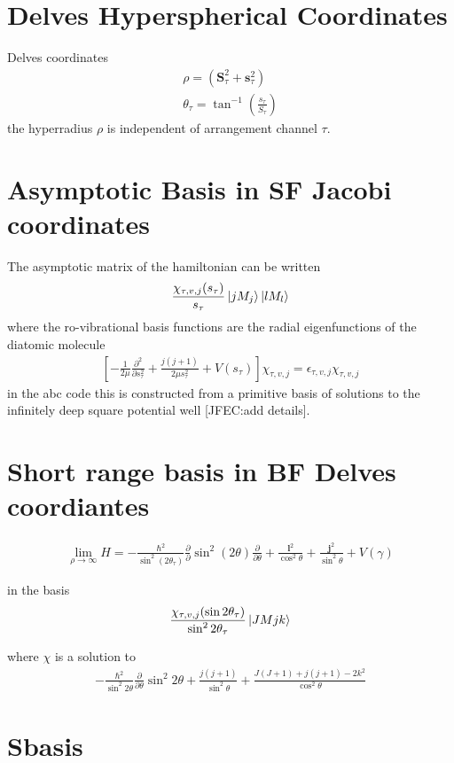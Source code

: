 \documentclass[aps,pra,onecolumn,showpacs,floatfix]{revtex4}
\begin{document}
\section{Delves Hyperspherical Coordinates}
Delves coordinates\cite{Delves:1958,Delves:1960}
\begin{align}\label{eqn:delves}
	\rho = (\mathbf{S}^2_\tau + \mathbf{s}^2_\tau ) \\
	\theta_\tau = \tan^{-1}({\frac{s_\tau}{S_\tau}})
\end{align}
the hyperradius $\rho$ is independent of arrangement channel $\tau$.

\section{Asymptotic Basis in SF Jacobi coordinates}
The asymptotic matrix of the hamiltonian can be written
\begin{align}\label{eqn:delves}
	\frac{\chi_{\tau,v,j}(s_\tau)}{s_\tau}\ket{jM_j}\ket{lM_l}
\end{align}
where the ro-vibrational basis functions are the radial eigenfunctions of the
diatomic molecule
\begin{align}\label{eqn:delves}
\left[-\frac{1}{2\mu}\frac{\partial^2}{\partial s_\tau^2} + \frac{j(j+1)}{2\mu s_\tau^2} + V(s_\tau)\right]\chi_{\tau,v,j}= \epsilon_{\tau,v,j}\chi_{\tau,v,j}
\end{align}
in the abc code this is constructed from a primitive basis of solutions to the
infinitely deep square potential well [JFEC:\@ add details].

\section{Short range basis in BF Delves coordiantes}
\begin{align}\label{eqn:delves}
	\lim_{\rho \to \infty}
	H = -\frac{\hbar^2}{\sin^2(2\theta_\tau)}\frac{\partial}{\partial}\sin^2(2\theta)\frac{\partial}{\partial\theta} + \frac{\mathbf{l}^2}{\cos^2\theta}+ \frac{\mathbf{j}^2}{\sin^2\theta} + V(\gamma)
\end{align}

in the basis
\begin{align}\label{eqn:delves}
	\frac{\chi_{\tau,v,j}(\sin{2\theta_\tau})}{\sin^2{2\theta_\tau}}\ket{JMjk}
\end{align}

where $\chi$ is a solution to
\begin{align}\label{eqn:delves}
	-\frac{\hbar^2}{\sin^2{2\theta}}\frac{\partial}{\partial\theta}\sin^2{2\theta} + \frac{j(j+1)}{\sin^2\theta} + \frac{J(J+1)+j(j+1)-2k^2}{\cos^2\theta}
\end{align}

\section{Sbasis}
\begin{acknowledgments}
\end{acknowledgments}


\end{document}
